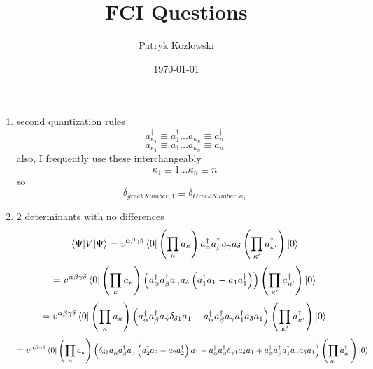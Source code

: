 \documentclass[12pt]{article}
\title{FCI Questions}
\author{Patryk Kozlowski}
\date{\today} %
\begin{document}
    \maketitle
\begin{enumerate}
    \item second quantization rules
    \begin{equation*}
        a^{\dag}_{\kappa_{1}}\equiv a^{\dag}_{1}...a^{\dag}_{\kappa_{n}}\equiv a^{\dag}_{n}
    \end{equation*}
    \begin{equation*}
        a_{\kappa_{1}}\equiv a_{1}\dots a_{\kappa_{n}} \equiv a_{n}
    \end{equation*}
    also, I frequently use these interchangeably
    \begin{equation*}
        \kappa_{1}\equiv 1\dots\kappa_{n}\equiv n
    \end{equation*}
    so
    \begin{equation*}
        \delta_{greekNumber, 1}\equiv \delta_{GreekNumber, \kappa_{1}}
    \end{equation*}
    \item 2 determinants with no differences
    \begin{dmath}
        \mel{\Psi}{V}{\Psi}=v^{\alpha\beta\gamma\delta}\bra{0}\left(\prod_{\kappa}^{}a_{\kappa}\right)a^{\dag}_{\alpha}a^{\dag}_{\beta}a_{\gamma}a_{\delta}
        \left(\prod_{\kappa^{\prime}}^{}a^{\dag}_{\kappa^{\prime}}\right)\ket{0}
    \end{dmath}
    \begin{dmath}
        =v^{\alpha\beta\gamma\delta}\bra{0}\left(\prod_{\kappa}^{}a_{\kappa}\right)\left(a^{\dag}_{\alpha}a^{\dag}_{\beta}a_{\gamma}a_{\delta}\left(a^{\dag}_{1}a_{1}-a_{1}a^{\dag}_{1}\right)\right)\left(\prod_{\kappa^{\prime}}^{}a^{\dag}_{\kappa^{\prime}}\right)\ket{0}
    \end{dmath}
    \begin{dmath}
        =v^{\alpha\beta\gamma\delta}\bra{0}\left(\prod_{\kappa}^{}a_{\kappa}\right)\left(a^{\dag}_{\alpha}a^{\dag}_{\beta}a_{\gamma}\delta_{\delta1}a_{1}-a^{\dag}_{\alpha}a^{\dag}_{\beta}a_{\gamma}a^{\dag}_{1}a_{\delta}a_{1}\right)\left(\prod_{\kappa^{\prime}}^{}a^{\dag}_{\kappa^{\prime}}\right)\ket{0}
    \end{dmath}
    \begin{dmath}
        =v^{\alpha\beta\gamma\delta}\bra{0}\left(\prod_{\kappa}^{}a_{\kappa}\right)\left(\delta_{\delta1}a^{\dag}_{\alpha}a^{\dag}_{\beta}a_{\gamma}\left(a^{\dag}_{2}a_{2}-a_{2}a^{\dag}_{2}\right)a_{1}-a^{\dag}_{\alpha}a^{\dag}_{\beta}\delta_{\gamma1}a_{\delta}a_{1}+a^{\dag}_{\alpha}a^{\dag}_{\beta}a^{\dag}_{1}a_{\gamma}a_{\delta}a_{1}\right)\left(\prod_{\kappa^{\prime}}^{}a^{\dag}_{\kappa^{\prime}}\right)\ket{0}

\end{dmath}
\end{enumerate}
\end{document}
